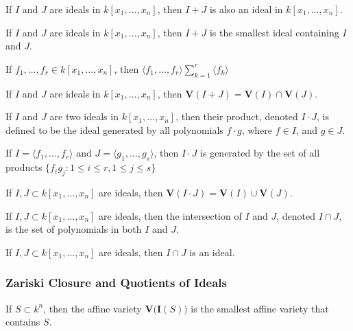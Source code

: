 \documentclass[../main.tex]{subfiles}
\begin{document}
\begin{theorem}
If $I$ and $J$ are ideals in $k[x_1,\hdots ,x_n]$, then $I+J$ is also an ideal in $k[x_1,\hdots ,x_n]$.
\end{theorem}

\begin{theorem}
If $I$ and $J$ are ideals in $k[x_1,\hdots ,x_n]$, then $I+J$ is the smallest ideal containing $I$ and $J$.
\end{theorem}

\begin{theorem}
If $f_1,\hdots, f_r \in k[x_1,\hdots ,x_n]$, then $\langle f_1,\hdots, f_r\rangle \sum_{k=1}^{r} \langle f_k\rangle$
\end{theorem}

\begin{theorem}
If $I$ and $J$ are ideals in $k[x_1,\hdots ,x_n]$, then $\textbf{V}(I+J) = \textbf{V}(I) \cap \textbf{V}(J)$.
\end{theorem}

\begin{definition}
If $I$ and $J$ are two ideals in $k[x_1,\hdots ,x_n]$, then their product, denoted $I\cdot J$, is defined to be the ideal generated by all polynomials $f\cdot g$, where $f\in I$, and $g\in J$.
\end{definition}

\begin{theorem}
If $I = \langle f_1,\hdots, f_r\rangle$ and $J = \langle g_1,\hdots, g_s\rangle$, then $I \cdot J$ is generated by the set of all products $\{f_ig_j:1\leq i\leq r, 1\leq j \leq s\}$
\end{theorem}

\begin{theorem}
If $I,J\subset k[x_1,\hdots ,x_n]$ are ideals, then $\textbf{V}(I\cdot J) = \textbf{V}(I)\cup \textbf{V}(J)$.
\end{theorem}

\begin{definition}
If $I,J\subset k[x_1,\hdots ,x_n]$ are ideals, then the intersection of $I$ and $J$, denoted $I\cap J$, is the set of polynomials in both $I$ and $J$.
\end{definition}

\begin{theorem}
If $I,J\subset k[x_1,\hdots ,x_n]$ are ideals, then $I\cap J$ is an ideal.
\end{theorem}
%
\subsubsection{Zariski Closure and Quotients of Ideals}
%
\begin{theorem}
If $S\subset k^n$, then the affine variety $\textbf{V}\big(\textbf{I}(S)\big)$ is the smallest affine variety that contains $S$.
\end{theorem}
\end{document}
